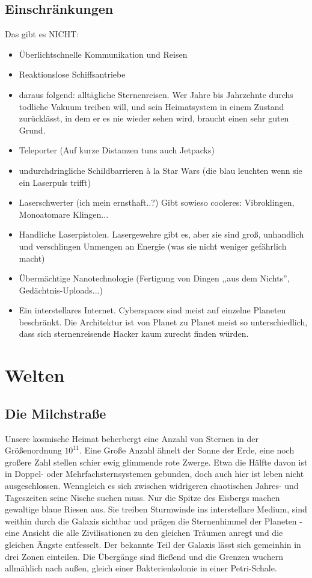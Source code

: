 \documentclass[10pt,a4paper]{report}
\begin{document}
\section{Einschränkungen}
Das gibt es NICHT:
\begin{itemize}
\item Überlichtschnelle Kommunikation und Reisen
\item Reaktionslose Schiffsantriebe
\item daraus folgend: alltägliche Sternenreisen. Wer Jahre bis Jahrzehnte durchs todliche Vakuum treiben will, und sein Heimatsystem in einem Zustand zurücklässt, in dem er es nie wieder sehen wird, braucht einen sehr guten Grund.
\item Teleporter (Auf kurze Distanzen tuns auch Jetpacks)
\item undurchdringliche Schildbarrieren à la Star Wars (die blau leuchten wenn sie ein Laserpuls trifft)
\item Laserschwerter (ich mein ernsthaft..?) Gibt sowieso cooleres: Vibroklingen, Monoatomare Klingen...
\item Handliche Laserpistolen. Lasergewehre gibt es, aber sie sind groß, unhandlich und verschlingen Unmengen an Energie (was sie nicht weniger gefährlich macht)
\item Übermächtige Nanotechnologie (Fertigung von Dingen ,,aus dem Nichts'', Gedächtnis-Uploads...)
\item Ein interstellares Internet. Cyberspaces sind meist auf einzelne Planeten beschränkt. Die Architektur ist von Planet zu Planet meist so unterschiedlich, dass sich sternenreisende Hacker kaum zurecht finden würden.
\end{itemize}

\chapter{Welten}

\section{Die Milchstraße}
Unsere kosmische Heimat beherbergt eine Anzahl von Sternen in der Größenordnung $10^{11}$. Eine Große Anzahl ähnelt der Sonne der Erde, eine noch großere Zahl stellen schier ewig glimmende rote Zwerge. Etwa die Hälfte davon ist in Doppel- oder Mehrfachsternsystemen gebunden, doch auch hier ist leben nicht ausgeschlossen. Wenngleich es sich zwischen widrigeren chaotischen Jahres- und Tageszeiten seine Nische suchen muss. Nur die Spitze des Eisbergs machen gewaltige blaue Riesen aus. Sie treiben Sturmwinde ins interstellare Medium, sind weithin durch die Galaxis sichtbar und prägen die Sternenhimmel der Planeten - eine Ansicht die alle Zivilisationen zu den gleichen Träumen anregt und die gleichen Ängste entfesselt.
Der bekannte Teil der Galaxis lässt sich gemeinhin in drei Zonen einteilen. Die Übergänge sind fließend und die Grenzen wuchern allmählich nach außen, gleich einer Bakterienkolonie in einer Petri-Schale.
\end{document}
